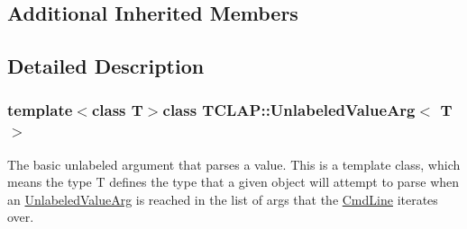 \subsection*{Additional Inherited Members}


\subsection{Detailed Description}
\subsubsection*{template$<$class T$>$class T\+C\+L\+A\+P\+::\+Unlabeled\+Value\+Arg$<$ T $>$}

The basic unlabeled argument that parses a value. This is a template class, which means the type T defines the type that a given object will attempt to parse when an \hyperlink{class_t_c_l_a_p_1_1_unlabeled_value_arg}{Unlabeled\+Value\+Arg} is reached in the list of args that the \hyperlink{class_t_c_l_a_p_1_1_cmd_line}{Cmd\+Line} iterates over. 

